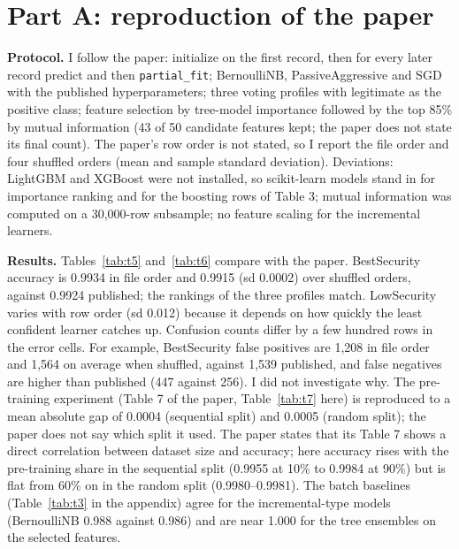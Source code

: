 \documentclass[10pt]{article}
\begin{document}
\section{Part A: reproduction of the paper}\label{sec:parta}
\textbf{Protocol.} I follow the paper: initialize on the first record, then for every later record predict and then \texttt{partial\_fit}; BernoulliNB, PassiveAggressive and SGD with the published hyperparameters; three voting profiles with legitimate as the positive class; feature selection by tree-model importance followed by the top 85\% by mutual information (43 of 50 candidate features kept; the paper does not state its final count). The paper's row order is not stated, so I report the file order and four shuffled orders (mean and sample standard deviation). Deviations: LightGBM and XGBoost were not installed, so scikit-learn models stand in for importance ranking and for the boosting rows of Table 3; mutual information was computed on a 30,000-row subsample; no feature scaling for the incremental learners.

\textbf{Results.} Tables~\ref{tab:t5} and~\ref{tab:t6} compare with the paper. BestSecurity accuracy is 0.9934 in file order and 0.9915 (sd 0.0002) over shuffled orders, against 0.9924 published; the rankings of the three profiles match. LowSecurity varies with row order (sd 0.012) because it depends on how quickly the least confident learner catches up. Confusion counts differ by a few hundred rows in the error cells. For example, BestSecurity false positives are 1,208 in file order and 1,564 on average when shuffled, against 1,539 published, and false negatives are higher than published (447 against 256). I did not investigate why. The pre-training experiment (Table 7 of the paper, Table~\ref{tab:t7} here) is reproduced to a mean absolute gap of 0.0004 (sequential split) and 0.0005 (random split); the paper does not say which split it used. The paper states that its Table 7 shows a direct correlation between dataset size and accuracy; here accuracy rises with the pre-training share in the sequential split (0.9955 at 10\% to 0.9984 at 90\%) but is flat from 60\% on in the random split (0.9980--0.9981). The batch baselines (Table~\ref{tab:t3} in the appendix) agree for the incremental-type models (BernoulliNB 0.988 against 0.986) and are near 1.000 for the tree ensembles on the selected features.

\begin{table}[t]
\centering
\caption{Reproduction of the paper's Table 5 (accuracy, F1, MCC). Legitimate is the positive class. Mean (sd) over four shuffled row orders.}
\label{tab:t5}

\end{table}
\begin{table}[t]
\centering
\caption{Reproduction of the paper's Table 6, file order: confusion counts, ours / paper.}
\label{tab:t6}

\end{table}
\begin{table}[t]
\centering
\caption{Pre-training experiment (the paper's Table 7): BestSecurity accuracy on the incremental part after pre-training on the first $p$\%.}
\label{tab:t7}

\end{table}
\end{document}
